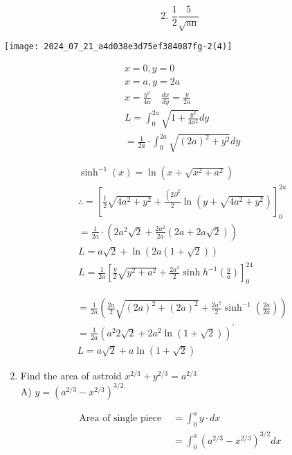 \documentclass[12pt, a4paper]{article}
\begin{document}
$$
\text { 2. } \frac{1}{2} \frac{5}{\sqrt{\operatorname{an}}}
$$

\begin{center}
\texttt{[image: 2024\_07\_21\_a4d038e3d75ef384087fg-2(4)]}
\end{center}

$$
\begin{aligned}
& x=0, y=0 \\
& x=a, y=2 a \\
& x=\frac{y^{2}}{4 a} \quad \frac{d x}{d y}=\frac{y}{2 a} \\
& L=\int_{0}^{2 a} \sqrt{1+\frac{y^{2}}{4 a^{2}}} d y \\
& =\frac{1}{2 a} \cdot \int_{0}^{2 a} \sqrt{(2 a)^{2}+y^{2}} d y
\end{aligned}
$$

$$
\begin{aligned}
& \sinh ^{-1}(x)=\ln \left(x+\sqrt{x^{2}+a^{2}}\right) \\
& \therefore=\left[\frac{1}{2} \sqrt{4 a^{2}+y^{2}}+\frac{\left(2 \partial^{2}\right.}{2} \ln \left(y+\sqrt{4 a^{2}+y^{2}}\right)\right]_{0}^{2 a} \\
& =\frac{1}{2 a} \cdot\left(2 a^{2} \sqrt{2}+\frac{2 a^{2}}{2 a}(2 a+2 a \sqrt{2})\right) \\
& L=a \sqrt{2}+\ln (2 a(1+\sqrt{2})) \\
& L=\frac{1}{2 a}\left[\frac{y}{2} \sqrt{y^{2}+a^{2}}+\frac{2 a^{2}}{2} \sinh h^{-1}\left(\frac{y}{a}\right)\right]_{0}^{24}
\end{aligned}
$$


\begin{align*}
& =\frac{1}{2 a}\left(\frac{2 a}{2} \sqrt{(2 a)^{2}+(2 a)^{2}}+\frac{2 a^{2}}{2} \sinh ^{-1}\left(\frac{2 a}{2 a}\right)\right) \\
& =\frac{1}{2 a}\left(a^{2} 2 \sqrt{2}+2 a^{2} \ln (1+\sqrt{2})\right)^{\prime} \\
& L=a \sqrt{2}+a \ln (1+\sqrt{2})
\end{align*}


\begin{enumerate}
  \setcounter{enumi}{1}
  \item Find the area of astroid $x^{2 / 3}+y^{2 / 3}=a^{2 / 3}$\\
A) $y=\left(a^{2 / 3}-x^{2 / 3}\right)^{3 / 2}$
\end{enumerate}

$$
\begin{aligned}
\text { Area of single piece } & =\int_{0}^{a} y \cdot d x \\
& =\int_{0}^{a}\left(a^{2 / 3}-x^{2 / 3}\right)^{3 / 2} d x
\end{aligned}
$$
\end{document}
